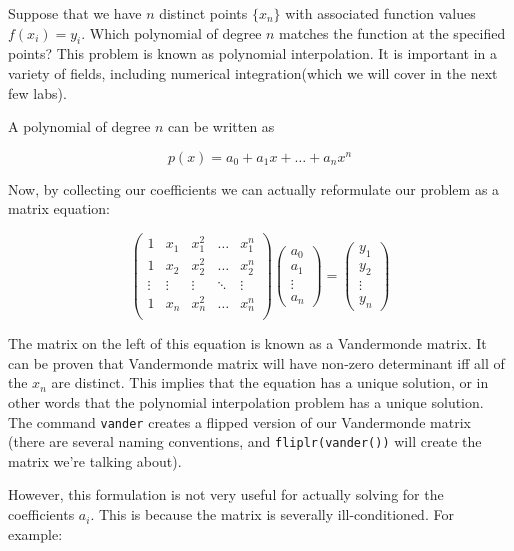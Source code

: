

Suppose that we have $n$ distinct points $\{x_n\}$ with associated function values $f(x_i) = y_i$. Which polynomial of degree $n$ matches the function at the specified points? This problem is known as polynomial interpolation. It is important in a variety of fields, including numerical integration(which we will cover in the next few labs).

A polynomial of degree $n$ can be written as

\[
p(x) = a_0 + a_1 x + \ldots + a_n x^n
\]

Now, by collecting our coefficients we can actually reformulate our problem as a matrix equation:

\[
\begin{pmatrix}
1 & x_1 & x_1^2 & \ldots & x_1^n \\
1 & x_2 & x_2^2 & \ldots & x_2^n \\
\vdots & \vdots & \vdots & \ddots & \vdots \\
1 & x_n & x_n^2 & \ldots & x_n^n \\
\end{pmatrix} \begin{pmatrix}
a_0 \\
a_1 \\
\vdots \\
a_n
\end{pmatrix} = \begin{pmatrix} y_1 \\ y_2 \\ \vdots \\ y_n \end{pmatrix}
\]

The matrix on the left of this equation is known as a Vandermonde matrix. It can be proven that Vandermonde matrix will have non-zero determinant iff all of the $x_n$ are distinct. This implies that the equation has a unique solution, or in other words that the polynomial interpolation problem has a unique solution. The command {\tt vander} creates a flipped version of our Vandermonde matrix (there are several naming conventions, and {\tt fliplr(vander())} will create the matrix we're talking about).

However, this formulation is not very useful for actually solving for the coefficients $a_i$. This is because the matrix is severally ill-conditioned. For example:


